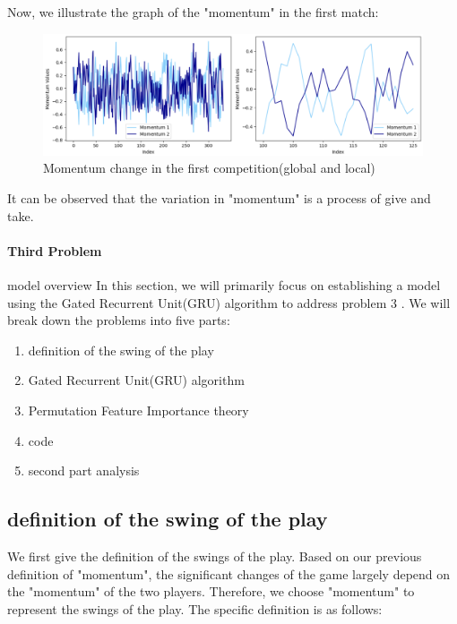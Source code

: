 \documentclass[12pt, a4paper, oneside]{article}
\theoremstyle{break}
\begin{document}
Now, we illustrate the graph of the "momentum" in the first match:


\begin{figure}[H]
    \centering
    \includegraphics[scale=0.65]{imgs/5.png}
    \caption{Momentum change in the first competition(global and local)}
\end{figure}


It can be observed that the variation in "momentum" is a process of give and take.

\paragraph{Third Problem}
model overview
In this section, we will primarily focus on establishing a model using the Gated Recurrent Unit(GRU) algorithm to 
address problem 3 . We will break down the problems into five parts:


\begin{enumerate}
    \item definition of the swing of the play
    \item Gated Recurrent Unit(GRU) algorithm
    \item Permutation Feature Importance theory
    \item code
    \item second part analysis
\end{enumerate}

\subsection{definition of the swing of the play}

We first give the definition of the swings of the play.
Based on our previous definition of "momentum", the significant changes of the game 
largely depend on the "momentum" of the two players. Therefore, we choose "momentum" to represent 
the swings of the play. The specific definition is as follows:\\
\end{document}
